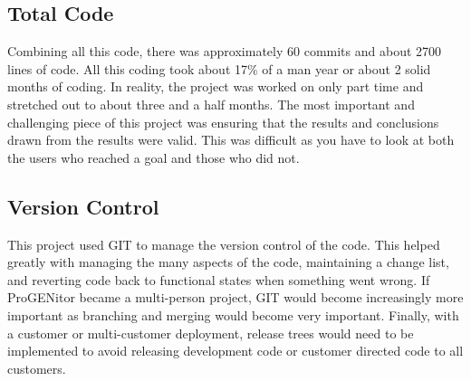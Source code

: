 \subsection{Total Code}
Combining all this code, there was approximately 60 commits and about 2700 lines
of code.  All this coding took about 17\% of a man year or about 2 solid months
of coding.  In reality, the project was worked on only part time and stretched
out to about three and a half months.  The most important and challenging piece
of this project was ensuring that the results and conclusions drawn from the
results were valid.  This was difficult as you have to look at both the users
who reached a goal and those who did not.
\subsection{Version Control}
This project used GIT to manage the version control of the code.  This helped
greatly with managing the many aspects of the code, maintaining a change list,
and reverting code back to functional states when something went wrong.  If
ProGENitor became a multi-person project, GIT would become increasingly more
important as branching and merging would become very important.  Finally,
with a customer or multi-customer deployment, release trees would need to be
implemented to avoid releasing development code or customer directed code to all
customers.
